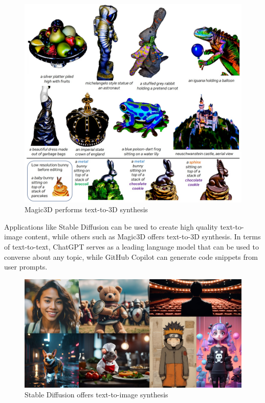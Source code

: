 \begin{figure}[H]
    \centering
    \includegraphics[width=\textwidth, height=0.5\textheight, keepaspectratio]{Images/Magic3D.jpg}
    \caption{Magic3D performs text-to-3D synthesis \cite{Magic3D}}
    \label{fig:magic3D}
\end{figure}

Applications like Stable Diffusion \cite{Stable_Diffusion} can be used to create high quality text-to-image content, while others such as Magic3D \cite{Magic3D} offers text-to-3D synthesis. In terms of text-to-text, ChatGPT \cite{Chat_GPT} serves as a leading language model that can be used to converse about any topic, while GitHub Copilot \cite{GitHub_Copilot} can generate code snippets from user prompts.

\begin{figure}[H]
    \centering
    \includegraphics[width=\textwidth, height=0.3\textheight, keepaspectratio]{Images/StableDiffusion.jpg}
    \caption{Stable Diffusion offers text-to-image synthesis \cite{Stable_Diffusion}}
    \label{fig:stableDiffusion}
\end{figure}

